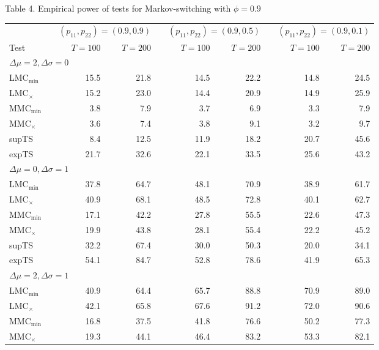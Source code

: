 \documentclass[11pt]{article}
\begin{document}
\begin{table}[p]
\begin{center}
Table 4. Empirical power of tests for Markov-switching with $\phi=0.9$
\medskip
\par
\begin{tabular}{lrrrrrrrrr}
\hline\hline
&  & \multicolumn{2}{c}{$(p_{11}, p_{22})=(0.9, 0.9)$} &  & 
\multicolumn{2}{c}{$(p_{11}, p_{22})=(0.9, 0.5)$} &  & \multicolumn{2}{c}{$%
(p_{11}, p_{22})=(0.9, 0.1)$} \\ \cline{3-4}\cline{6-7}\cline{9-10}
Test &  & $T=100$ & $T=200$ &  & $T=100$ & $T=200$ &  & $T=100$ & $T=200$ \\ 
\hline
\multicolumn{10}{l}{$\Delta \mu =2, \Delta \sigma=0$} \\ 
LMC$_{\min}$ &  & 15.5 & 21.8 &  & 14.5 & 22.2 &  & 14.8 & 24.5 \\ 
LMC$_{\times}$ &  & 15.2 & 23.0 &  & 14.4 & 20.9 &  & 14.9 & 25.9 \\ 
MMC$_{\min}$ &  & 3.8 & 7.9 &  & 3.7 & 6.9 &  & 3.3 & 7.9 \\ 
MMC$_{\times}$ &  & 3.6 & 7.4 &  & 3.8 & 9.1 &  & 3.2 & 9.7 \\ 
supTS &  & 8.4 & 12.5 &  & 11.9 & 18.2 &  & 20.7 & 45.6 \\ 
expTS &  & 21.7 & 32.6 &  & 22.1 & 33.5 &  & 25.6 & 43.2 \\ 
\multicolumn{10}{l}{$\Delta \mu =0, \Delta \sigma=1$} \\ 
LMC$_{\min}$ &  & 37.8 & 64.7 &  & 48.1 & 70.9 &  & 38.9 & 61.7 \\ 
LMC$_{\times}$ &  & 40.9 & 68.1 &  & 48.5 & 72.8 &  & 40.1 & 62.7 \\ 
MMC$_{\min}$ &  & 17.1 & 42.2 &  & 27.8 & 55.5 &  & 22.6 & 47.3 \\ 
MMC$_{\times}$ &  & 19.9 & 43.8 &  & 28.1 & 55.4 &  & 22.2 & 45.2 \\ 
supTS &  & 32.2 & 67.4 &  & 30.0 & 50.3 &  & 20.0 & 34.1 \\ 
expTS &  & 54.1 & 84.7 &  & 52.8 & 78.6 &  & 41.9 & 65.3 \\ 
\multicolumn{10}{l}{$\Delta \mu =2, \Delta \sigma=1$} \\ 
LMC$_{\min}$ &  & 40.9 & 64.4 &  & 65.7 & 88.8 &  & 70.9 & 89.0 \\ 
LMC$_{\times}$ &  & 42.1 & 65.8 &  & 67.6 & 91.2 &  & 72.0 & 90.6 \\ 
MMC$_{\min}$ &  & 16.8 & 37.5 &  & 41.8 & 76.6 &  & 50.2 & 77.3 \\ 
MMC$_{\times}$ &  & 19.3 & 44.1 &  & 46.4 & 83.2 &  & 53.3 & 82.1 \\ 

\end{tabular}
\end{center}
\end{table}
\end{document}
